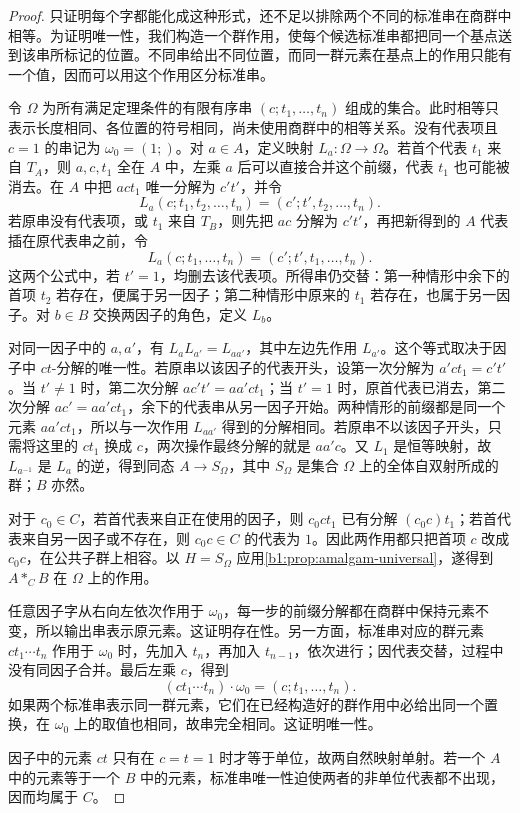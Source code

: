 \begin{proof}
	只证明每个字都能化成这种形式，还不足以排除两个不同的标准串在商群中相等。为证明唯一性，我们构造一个群作用，使每个候选标准串都把同一个基点送到该串所标记的位置。不同串给出不同位置，而同一群元素在基点上的作用只能有一个值，因而可以用这个作用区分标准串。

	令 \(\Omega\) 为所有满足定理条件的有限有序串 \((c;t_1,\ldots,t_n)\) 组成的集合。此时相等只表示长度相同、各位置的符号相同，尚未使用商群中的相等关系。没有代表项且 \(c=1\) 的串记为 \(\omega_0=(1;)\)。对 \(a\in A\)，定义映射 \(L_a:\Omega\rightarrow\Omega\)。若首个代表 \(t_1\) 来自 \(T_A\)，则 \(a,c,t_1\) 全在 \(A\) 中，左乘 \(a\) 后可以直接合并这个前缀，代表 \(t_1\) 也可能被消去。在 \(A\) 中把 \(act_1\) 唯一分解为 \(c't'\)，并令
	\[
		L_a(c;t_1,t_2,\ldots,t_n)=(c';t',t_2,\ldots,t_n).
	\]
	若原串没有代表项，或 \(t_1\) 来自 \(T_B\)，则先把 \(ac\) 分解为 \(c't'\)，再把新得到的 \(A\) 代表插在原代表串之前，令
	\[
		L_a(c;t_1,\ldots,t_n)=(c';t',t_1,\ldots,t_n).
	\]
	这两个公式中，若 \(t'=1\)，均删去该代表项。所得串仍交替：第一种情形中余下的首项 \(t_2\) 若存在，便属于另一因子；第二种情形中原来的 \(t_1\) 若存在，也属于另一因子。对 \(b\in B\) 交换两因子的角色，定义 \(L_b\)。

	对同一因子中的 \(a,a'\)，有 \(L_aL_{a'}=L_{aa'}\)，其中左边先作用 \(L_{a'}\)。这个等式取决于因子中 \(ct\)-分解的唯一性。若原串以该因子的代表开头，设第一次分解为 \(a'ct_1=c't'\)。当 \(t'\ne1\) 时，第二次分解 \(ac't'=aa'ct_1\)；当 \(t'=1\) 时，原首代表已消去，第二次分解 \(ac'=aa'ct_1\)，余下的代表串从另一因子开始。两种情形的前缀都是同一个元素 \(aa'ct_1\)，所以与一次作用 \(L_{aa'}\) 得到的分解相同。若原串不以该因子开头，只需将这里的 \(ct_1\) 换成 \(c\)，两次操作最终分解的就是 \(aa'c\)。又 \(L_1\) 是恒等映射，故 \(L_{a^{-1}}\) 是 \(L_a\) 的逆，得到同态 \(A\rightarrow S_\Omega\)，其中 \(S_\Omega\) 是集合 \(\Omega\) 上的全体自双射所成的群；\(B\) 亦然。

	对于 \(c_0\in C\)，若首代表来自正在使用的因子，则 \(c_0ct_1\) 已有分解 \((c_0c)t_1\)；若首代表来自另一因子或不存在，则 \(c_0c\in C\) 的代表为 \(1\)。因此两作用都只把首项 \(c\) 改成 \(c_0c\)，在公共子群上相容。以 \(H=S_\Omega\) 应用\cref{b1:prop:amalgam-universal}，遂得到 \(A*_C B\) 在 \(\Omega\) 上的作用。

	任意因子字从右向左依次作用于 \(\omega_0\)，每一步的前缀分解都在商群中保持元素不变，所以输出串表示原元素。这证明存在性。另一方面，标准串对应的群元素 \(ct_1\cdots t_n\) 作用于 \(\omega_0\) 时，先加入 \(t_n\)，再加入 \(t_{n-1}\)，依次进行；因代表交替，过程中没有同因子合并。最后左乘 \(c\)，得到
	\[
		(ct_1\cdots t_n)\cdot\omega_0=(c;t_1,\ldots,t_n).
	\]
	如果两个标准串表示同一群元素，它们在已经构造好的群作用中必给出同一个置换，在 \(\omega_0\) 上的取值也相同，故串完全相同。这证明唯一性。

	因子中的元素 \(ct\) 只有在 \(c=t=1\) 时才等于单位，故两自然映射单射。若一个 \(A\) 中的元素等于一个 \(B\) 中的元素，标准串唯一性迫使两者的非单位代表都不出现，因而均属于 \(C\)。
\end{proof}


